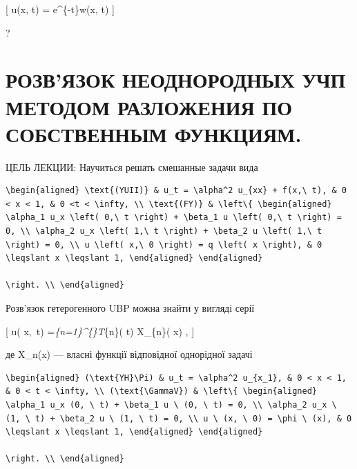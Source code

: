 \documentclass[
  ukrainian,
]{article}
\begin{document}
{[} u(x, t) = e\^{}\{-t\}w(x, t) {]}

?

\section{РОЗВ'ЯЗОК НЕОДНОРОДНЫХ УЧП МЕТОДОМ РАЗЛОЖЕНИЯ ПО СОБСТВЕННЫМ
ФУНКЦИЯМ.}\label{ux440ux43eux437ux432ux44fux437ux43eux43a-ux43dux435ux43eux434ux43dux43eux440ux43eux434ux43dux44bux445-ux443ux447ux43f-ux43cux435ux442ux43eux434ux43eux43c-ux440ux430ux437ux43bux43eux436ux435ux43dux438ux44f-ux43fux43e-ux441ux43eux431ux441ux442ux432ux435ux43dux43dux44bux43c-ux444ux443ux43dux43aux446ux438ux44fux43c.}

ЦЕЛЬ ЛЕКЦИИ: Научиться решать смешанные задачи вида

\begin{verbatim}
\begin{aligned} \text{(YUII)} & u_t = \alpha^2 u_{xx} + f(x,\ t), & 0 < x < 1, & 0 <t < \infty, \\ \text{(FY)} & \left\{ \begin{aligned} \alpha_1 u_x \left( 0,\ t \right) + \beta_1 u \left( 0,\ t \right) = 0, \\ \alpha_2 u_x \left( 1,\ t \right) + \beta_2 u \left( 1,\ t \right) = 0, \\ u \left( x,\ 0 \right) = q \left( x \right), & 0 \leqslant x \leqslant 1, \end{aligned} \end{aligned}

\right. \\ \end{aligned}
\end{verbatim}

Розв'язок гетерогенного UBP можна знайти у вигляді серії

{[} u\left( x,~t\right) =\sum\emph{\{n=1\}\^{}\{\infty\}T}\{n\}\left(
t\right) X\_\{n\}\left( x\right) , {]}

де X\_n\left(x\right) --- власні функції відповідної однорідної задачі

\begin{verbatim}
\begin{aligned} (\text{YH}\Pi) & u_t = \alpha^2 u_{x_1}, & 0 < x < 1, & 0 < t < \infty, \\ (\text{\GammaV}) & \left\{ \begin{aligned} \alpha_1 u_x (0, \ t) + \beta_1 u \ (0, \ t) = 0, \\ \alpha_2 u_x \ (1, \ t) + \beta_2 u \ (1, \ t) = 0, \\ u \ (x, \ 0) = \phi \ (x), & 0 \leqslant x \leqslant 1, \end{aligned} \end{aligned}

\right. \\ \end{aligned}
\end{verbatim}
\end{document}
